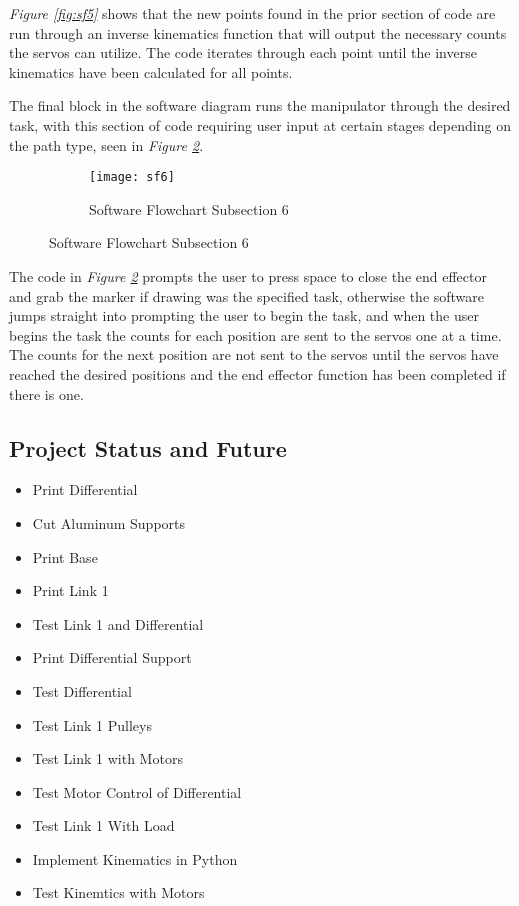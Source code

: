 \emph{Figure \ref{fig:sf5}} shows that the new points found in the prior section of code are run through an inverse kinematics function that will output the necessary counts the servos can utilize. The code iterates through each point until the inverse kinematics have been calculated for all points.

The final block in the software diagram runs the manipulator through the desired task, with this section of code requiring user input at certain stages depending on the path type, seen in \emph{Figure \ref{fig:sf6}}.
\begin{figure}[htp] \ContinuedFloat
  \begin{subfigure}[c]{\textwidth}
  \center
  \texttt{[image: sf6]}
  \caption{Software Flowchart Subsection 6}
  \label{fig:sf6}
  \end{subfigure}
\end{figure}

The code in \emph{Figure \ref{fig:sf6}} prompts the user to press space to close the end effector and grab the marker if drawing was the specified task, otherwise the software jumps straight into prompting the user to begin the task, and when the user begins the task the counts for each position are sent to the servos one at a time. The counts for the next position are not sent to the servos until the servos have reached the desired positions and the end effector function has been completed if there is one.

% 
\newpage
\subsection{Project Status and Future}
\begin{itemize}[label=---]
  \item Print Differential
  \item Cut Aluminum Supports
  \item Print Base
  \item Print Link 1
  \item Test Link 1 and Differential
  \item Print Differential Support
  \item Test Differential
  \item Test Link 1 Pulleys
  \item Test Link 1 with Motors
  \item Test Motor Control of Differential
  \item Test Link 1 With Load
  \item Implement Kinematics in Python
  \item Test Kinemtics with Motors
\end{itemize}
% 
\newpage
